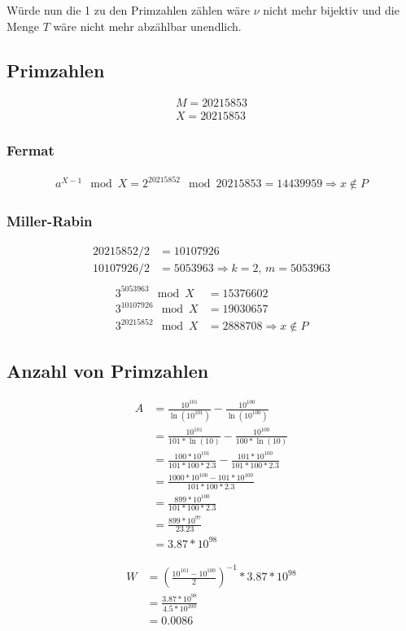 \documentclass{article}
\begin{document}
\subsubsection{}

Würde nun die 1 zu den Primzahlen zählen wäre $\nu$ nicht mehr bijektiv und die
Menge $T$ wäre nicht mehr abzählbar unendlich.

\subsection{Primzahlen}

\begin{align*}
	M = 20215853\\
	X = 20215853
\end{align*}

\subsubsection{Fermat}

\begin{align*}
	a^{X-1} \mod X = 2^{20215852} \mod 20215853 = 14439959 \Rightarrow x \notin P
\end{align*}

\subsubsection{Miller-Rabin}

\begin{align*}
	20215852 / 2 & = 10107926\\
	10107926 / 2 & = 5053963 \Rightarrow k = 2,\,m = 5053963\\
\end{align*}
\begin{align*}
	3^{5053963} \mod X & = 15376602\\
	3^{10107926} \mod X & = 19030657\\
	3^{20215852} \mod X & = 2888708 \Rightarrow x \notin P
\end{align*}

\subsection{Anzahl von Primzahlen}

\begin{align*}
	A & = \frac{10^{101}}{\ln(10^{101})} - \frac{10^{100}}{\ln(10^{100})}\\
	  & = \frac{10^{101}}{101*\ln(10)} - \frac{10^{100}}{100*\ln(10)}\\
	  & = \frac{100*10^{101}}{101*100*2.3} - \frac{101*10^{100}}{101*100*2.3}\\
	  & = \frac{1000*10^{100} - 101*10^{100}}{101*100*2.3}\\
	  & = \frac{899*10^{100}}{101*100*2.3}\\
	  & = \frac{899*10^{97}}{23.23}\\
	  & = 3.87*10^{98}
\end{align*}


\begin{align*}
	W & = {(\frac{10^{101} - 10^{100}}{2})}^{-1} * 3.87*10^{98}\\
	  & = \frac{3.87*10^{98}}{4.5*10^{100}}\\
	  & = 0.0086
\end{align*}
\end{document}

